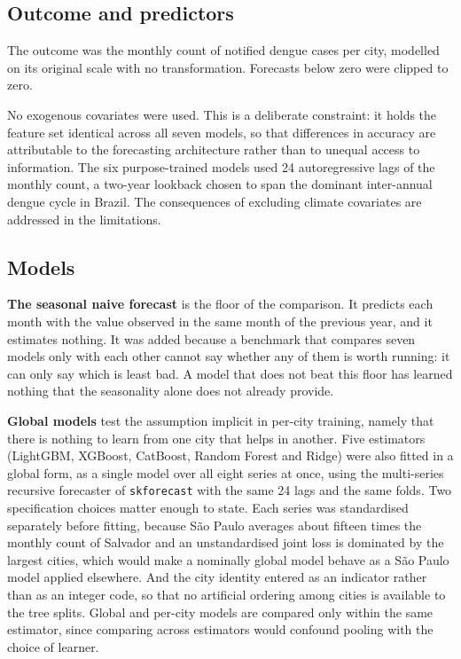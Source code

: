 \documentclass[11pt]{article}
\begin{document}
\subsection{Outcome and predictors}

The outcome was the monthly count of notified dengue cases per city, modelled on its
original scale with no transformation. Forecasts below zero were clipped to zero.

No exogenous covariates were used. This is a deliberate constraint: it holds the feature
set identical across all seven models, so that differences in accuracy are attributable to
the forecasting architecture rather than to unequal access to information. The six
purpose-trained models used 24 autoregressive lags of the monthly count, a two-year
lookback chosen to span the dominant inter-annual dengue cycle in Brazil. The
consequences of excluding climate covariates are addressed in the limitations.

\subsection{Models}

\textbf{The seasonal naive forecast} is the floor of the comparison. It predicts each
month with the value observed in the same month of the previous year, and it estimates
nothing. It was added because a benchmark that compares seven models only with each other
cannot say whether any of them is worth running: it can only say which is least bad. A
model that does not beat this floor has learned nothing that the seasonality alone does
not already provide.

\textbf{Global models} test the assumption implicit in per-city training, namely that
there is nothing to learn from one city that helps in another. Five estimators (LightGBM,
XGBoost, CatBoost, Random Forest and Ridge) were also fitted in a global form, as a single
model over all eight series at once, using the multi-series recursive forecaster of
\texttt{skforecast} with the same 24 lags and the same folds. Two specification choices
matter enough to state. Each series was standardised separately before fitting, because
S\~ao Paulo averages about fifteen times the monthly count of Salvador and an unstandardised
joint loss is dominated by the largest cities, which would make a nominally global model
behave as a S\~ao Paulo model applied elsewhere. And the city identity entered as an
indicator rather than as an integer code, so that no artificial ordering among cities is
available to the tree splits. Global and per-city models are compared only within the same
estimator, since comparing across estimators would confound pooling with the choice of
learner.
\end{document}
